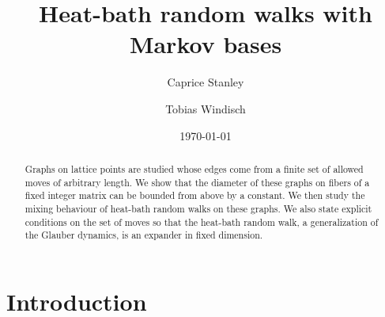 \documentclass[11pt]{amsart}
\theoremstyle{definition}
\numberwithin{equation}{section}
\renewcommand{\>}{\rangle}
\newcommand{\<}{\langle}
\newcommand{\0}{\mathbf{0}}
\newcommand{\1}{\mathbf{1}}
\newcommand{\2}{\mathbf{2}}
\begin{document}
\title{Heat-bath random walks with Markov bases}


\author{Caprice Stanley}
\address{NC State University, Raleigh, NC 27695, USA} 

\author{Tobias Windisch}
\address{Otto-von-Guericke Universität\\ Magdeburg, Germany} 

\date{\today}

\makeatletter
\makeatother




\begin{abstract}
Graphs on lattice points are studied whose edges come from a finite
set of allowed moves of arbitrary length. We show that the diameter of
these graphs on fibers of a fixed integer matrix can be bounded from
above by a constant. We then study the mixing behaviour of heat-bath
random walks on these graphs. We also state explicit conditions on the
set of moves so that the heat-bath random walk, a generalization of
the Glauber dynamics, is an expander in fixed dimension.
\end{abstract}

\maketitle
\setcounter{tocdepth}{1}
\tableofcontents

\section{Introduction}
\end{document}
